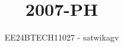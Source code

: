 \documentclass[journal]{IEEEtran}
\begin{document}

\vspace{3cm}

\title{2007-PH}
\author{EE24BTECH11027 - satwikagv}
{\let\newpage\relax\maketitle}

\renewcommand{\thefigure}{\theenumi}
\renewcommand{\thetable}{\theenumi}
\setlength{\intextsep}{10pt} %


\renewcommand{\thetable}{\theenumi}
\end{document}
